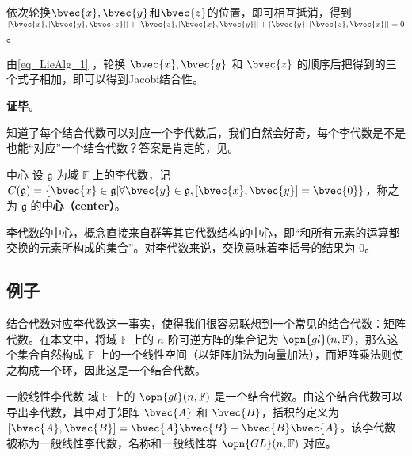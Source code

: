 依次轮换$\bvec{x}, \bvec{y}$和$\bvec{z}$的位置，即可相互抵消，得到$[\bvec{x}, [\bvec{y}, \bvec{z}]]+[\bvec{z}, [\bvec{x}, \bvec{y}]]+[\bvec{y}, [\bvec{z}, \bvec{x}]]=0$。


由\autoref{eq_LieAlg_1} ，轮换 $\bvec{x}, \bvec{y}$ 和 $\bvec{z}$ 的顺序后把得到的三个式子相加，即可以得到Jacobi结合性。



\textbf{证毕}。

知道了每个结合代数可以对应一个李代数后，我们自然会好奇，每个李代数是不是也能“对应”一个结合代数？答案是肯定的，见。


\begin{definition}{中心}\label{def_LieAlg_1}
设 $\mathfrak{g}$ 为域 $\mathbb{F}$ 上的李代数，记 $C(\mathfrak{g})=\{\bvec{x}\in\mathfrak{g}|\forall\bvec{y}\in\mathfrak{g}, [\bvec{x}, \bvec{y}]=\bvec{0}\}$，称之为 $\mathfrak{g}$ 的\textbf{中心（center）}。
\end{definition}

李代数的中心，概念直接来自群等其它代数结构的中心，即“和所有元素的运算都交换的元素所构成的集合”。对李代数来说，交换意味着李括号的结果为 $0$。



\subsection{例子}

结合代数对应李代数这一事实，使得我们很容易联想到一个常见的结合代数：矩阵代数。在本文中，将域 $\mathbb{F}$ 上的 $n$ 阶可逆方阵的集合记为 $\opn{gl}(n, \mathbb{F})$，那么这个集合自然构成 $\mathbb{F}$ 上的一个线性空间（以矩阵加法为向量加法），而矩阵乘法则使之构成一个环，因此这是一个结合代数。

\begin{example}{一般线性李代数}
域 $\mathbb{F}$ 上的 $\opn{gl}(n, \mathbb{F})$ 是一个结合代数。由这个结合代数可以导出李代数，其中对于矩阵 $\bvec{A}$ 和 $\bvec{B}$，括积的定义为 $[\bvec{A}, \bvec{B}]=\bvec{A}\bvec{B}-\bvec{B}\bvec{A}$。该李代数被称为一般线性李代数，名称和一般线性群 $\opn{GL}(n, \mathbb{F})$ 对应。%
\end{example}

